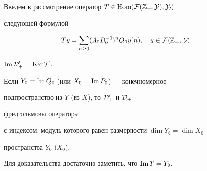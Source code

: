  


Введем в рассмотрение оператор $T\in\operatorname{Hom}(\cal F(\Bbb Z_+,Y),Y_0)$ 


следующей формулой 


$$ 


T y=\sum_{n\ge0}(A_0B^{-1}_0)^n Q_0y(n),\quad 


y\in\cal F(\Bbb Z_+,Y). 


$$ 


 


\begin{cor} 


$\operatorname{Im}\cal D^0_+=\operatorname{Ker} T$. 


\end{cor} 


 


\begin{cor} 


Если $Y_0=\operatorname{Im} Q_0$ (или $X_0=\operatorname{Im} P_0$) --- конечномерное 


подпространство из $Y$ (из $X$), то $\cal D^0_+$ и $\cal D_+$ --- 


фредгольмовы операторы 


с индексом, модуль которого равен размерности $\dim Y_0=\dim X_0$ 


пространства $Y_0$ ($X_0$). 


\end{cor} 


 


Для доказательства достаточно заметить, что $\operatorname{Im} T=Y_0$. 


 



